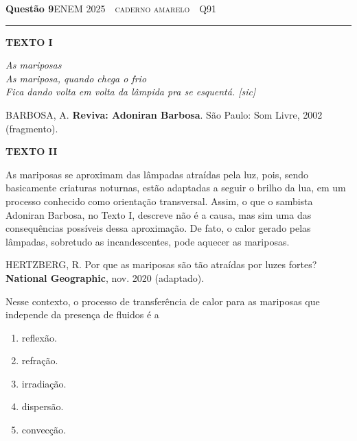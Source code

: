 \documentclass[11pt,a4paper]{article}
\newcommand{\fonte}[1]{{\small\scshape\color{grafite}#1}}
\newenvironment{questao}[2]{%
  \needspace{6\baselineskip}
  \par\addvspace{1.6em}
  {\large\bfseries\color{vinho}Quest\~ao #1}\hfill #2\\[-0.55em]
  {\color{black!25}\rule{\linewidth}{0.4pt}}
  \par\nobreak\smallskip
}{\par\addvspace{0.4em}}
\newcommand{\fontebib}[1]{{\raggedleft\scriptsize\color{grafite}#1\par}}
\begin{document}
\begin{questao}{9}{\fonte{ENEM 2025 \,\textperiodcentered\, caderno amarelo \,\textperiodcentered\, Q91}}
\textbf{TEXTO I}

\begin{center}
\itshape
As mariposas\\[0.2em]
As mariposa, quando chega o frio\\
Fica dando volta em volta da l\^ampida pra se esquent\'a. [sic]
\end{center}

\fontebib{BARBOSA, A. \textbf{Reviva: Adoniran Barbosa}. S\~ao Paulo:
Som Livre, 2002 (fragmento).}

\textbf{TEXTO II}

As mariposas se aproximam das l\^ampadas atra\'idas pela luz, pois, sendo
basicamente criaturas noturnas, est\~ao adaptadas a seguir o brilho da
lua, em um processo conhecido como orienta\c{c}\~ao transversal. Assim, o
que o sambista Adoniran Barbosa, no Texto I, descreve n\~ao \'e a causa,
mas sim uma das consequ\^encias poss\'iveis dessa aproxima\c{c}\~ao. De fato, o
calor gerado pelas l\^ampadas, sobretudo as incandescentes, pode aquecer
as mariposas.

\fontebib{HERTZBERG, R. Por que as mariposas s\~ao t\~ao atra\'idas por
luzes fortes? \textbf{National Geographic}, nov. 2020 (adaptado).}

Nesse contexto, o processo de transfer\^encia de calor para as mariposas
que independe da presen\c{c}a de fluidos \'e a
\begin{enumerate}
  \item reflex\~ao.
  \item refra\c{c}\~ao.
  \item irradia\c{c}\~ao.
  \item dispers\~ao.
  \item convec\c{c}\~ao.
\end{enumerate}
\end{questao}
\end{document}
